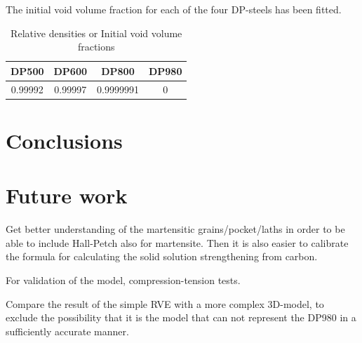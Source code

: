 \documentclass{article}
\begin{document}
The initial void volume fraction for each of the four DP-steels has been fitted. 

\begin{center}
\begin{table}[h!]
    \centering
    \begin{tabular}{cccc}
    \hline
         DP500 & DP600 & DP800 & DP980  \\ [0.5ex]
         \hline
         \rowcolor{Gray}
          0.99992 & 0.99997 & 0.9999991 & 0 \\
         \hline
    \end{tabular}
    \caption{Relative densities or Initial void volume fractions}
    \label{tab:Voidvolfrac}
\end{table}
\end{center}

\section{Conclusions}
\section{Future work}
Get better understanding of the martensitic grains/pocket/laths in order to be able to include Hall-Petch also for martensite. Then it is also easier to calibrate the formula for calculating the solid solution strengthening from carbon. 

For validation of the model, compression-tension tests. 

Compare the result of the simple RVE with a more complex 3D-model, to exclude the possibility that it is the model that can not represent the DP980 in a sufficiently accurate manner.
\end{document}
